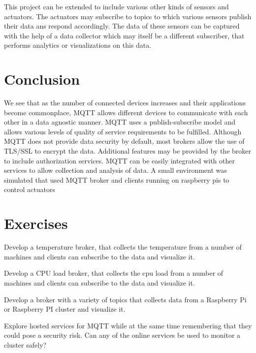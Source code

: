 This project can be extended to include various other kinds of sensors
and actuators. The actuators may subscribe to topics to which various
sensors publish their data ans respond accordingly. The data of these
sensors can be captured with the help of a data collector which may
itself be a different subscriber, that performs analytics or
visualizations on this data.


\section{Conclusion}

We see that as the number of connected devices increases and their
applications become commonplace, MQTT allows different devices to
communicate with each other in a data agnostic manner. MQTT uses a
publish-subscribe model and allows various levels of quality of
service requirements to be fulfilled. Although MQTT does not provide
data security by default, most brokers allow the use of TLS/SSL to
encrypt the data. Additional features may be provided by the broker to
include authorization services. MQTT can be easily integrated with
other services to allow collection and analysis of data. A small
environment was simulated that used MQTT broker and clients running on
raspberry pis to control actuators

\section{Exercises}

\begin{exercise}
Develop a temperature broker, that collects the temperature from a
number of machines and clients can subscribe to the data and visualize it.
\end{exercise}

\begin{exercise}
Develop a CPU load broker, that collects the cpu load from a
number of machines and clients can subscribe to the data and visualize it.
\end{exercise}

\begin{exercise}
Develop a broker with a variety of topics that collects data from a
Raspberry Pi or Raspberry PI cluster and visualize it.
\end{exercise}

\begin{exercise}
Explore hosted services for MQTT while at the same time remembering
that they could pose a security risk. Can any of the online services
be used to monitor a cluster safely?
\end{exercise}



